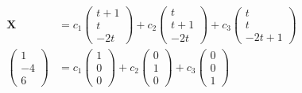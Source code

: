 \documentclass{article}
\begin{document}
\begin{align*}
  \mathbf{X}      & = c_1 \begin{pmatrix}
                            t + 1 \\
                            t     \\
                            -2 t
                          \end{pmatrix} + c_2 \begin{pmatrix}
                                                t     \\
                                                t + 1 \\
                                                -2 t
                                              \end{pmatrix} + c_3 \begin{pmatrix}
                                                                    t \\
                                                                    t \\
                                                                    -2 t + 1
                                                                  \end{pmatrix} \\
  \begin{pmatrix}
    1  \\
    -4 \\
    6
  \end{pmatrix} & = c_1 \begin{pmatrix}
                          1 \\
                          0 \\
                          0
                        \end{pmatrix} + c_2 \begin{pmatrix}
                                              0 \\
                                              1 \\
                                              0
                                            \end{pmatrix} + c_3 \begin{pmatrix}
                                                                  0 \\
                                                                  0 \\
                                                                  1

\end{pmatrix}
\end{align*}
\end{document}
